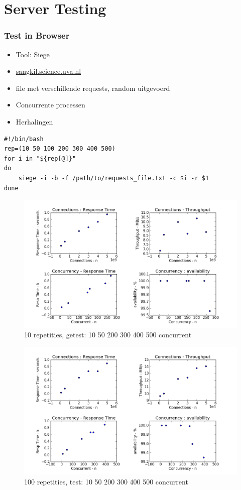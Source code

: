 \documentclass[10pt,a4paper]{beamer}
\begin{document}
\section{Server Testing}
\begin{frame}[fragile]
\frametitle{Test in Browser}
\begin{itemize}
\item Tool: Siege
\item \url{sangkil.science.uva.nl}
\item file met verschillende requests, random uitgevoerd
\item Concurrente processen
\item Herhalingen
\end{itemize}
\begin{lstlisting}
#!/bin/bash
rep=(10 50 100 200 300 400 500)
for i in "${rep[@]}"
do
	siege -i -b -f /path/to/requests_file.txt -c $i -r $1
done
\end{lstlisting}
\end{frame}
\begin{frame}
\begin{figure}
\includegraphics[scale=0.4]{siege_10r.png}
\caption{10 repetities, getest: 10 50 200 300 400 500 concurrent}
\end{figure}
\end{frame}
\begin{frame}
\begin{figure}
\includegraphics[scale=0.4]{siege_100r.png}
\caption{100 repetities, test: 10 50 200 300 400 500 concurrent}
\end{figure}
\end{frame}
\end{document}
